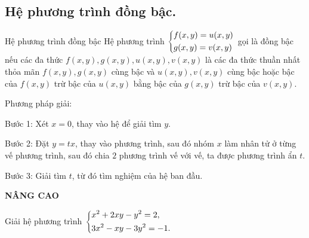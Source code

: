 \subsection{Hệ phương trình đồng bậc.}
  \begin{dang}{Hệ phương trình đồng bậc}
  Hệ phương trình $\left\{\begin{aligned}& f(x,y) = u(x,y) \\ & g(x,y) = v(x,y)\end{aligned}\right.$ gọi là đồng bậc nếu các đa thức $f(x,y), g(x,y), u(x,y), v(x,y)$ là các đa 
thức thuần nhất thỏa mãn  $f(x,y), g(x,y)$ cùng bậc và   $u(x,y),v(x,y)$ cùng bậc hoặc bậc của $f(x,y)$ trừ bậc của $u(x,y)$ bằng bậc của $g(x,y)$ 
trừ bậc của $v(x,y)$.

Phương pháp giải: 

Bước 1: Xét $x =0$, thay vào hệ để giải tìm $y$.

Bước 2: Đặt $y = tx$, thay vào phương trình, sau đó nhóm $x$ làm nhân tử ở từng vế phương trình, sau đó chia $2$
phương trình vế với vế, ta được phương trình ẩn $t$.

Bước 3: Giải tìm $t$, từ đó tìm nghiệm của hệ ban đầu.
   \end{dang}
\begin{center}
  \textbf{NÂNG CAO} 
  \end{center}  
   \begin{ex}%
Giải hệ phương trình $\left\{\begin{aligned}& x^2+2xy-y^2 = 2, \\ & 3x^2 - xy -3y^2 = -1. \end{aligned}\right.$
   \end{ex}

